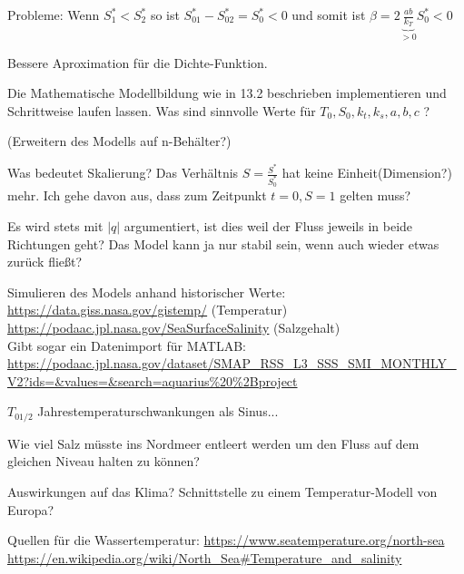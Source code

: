 \documentclass[11pt,a4paper]{article}
\begin{document}
	Probleme:
	Wenn \(S^*_1 < S^*_2\) so ist \(S^*_01 - S^*_02 = S^*_0 < 0\) und somit ist \(\beta = 2\underbrace{\frac{ab}{k_T}}_{>0}S^*_0 < 0\)

	Bessere Aproximation für die Dichte-Funktion.
	
	Die Mathematische Modellbildung wie in 13.2 beschrieben implementieren und Schrittweise laufen lassen. Was sind sinnvolle Werte für \( T_0, S_0, k_t, k_s,  a, b, c\) ?

	(Erweitern des Modells auf n-Behälter?)

	Was bedeutet Skalierung?	 Das Verhältnis \( S = \frac{S^*}{S^*_0} \) hat keine Einheit(Dimension?) mehr. Ich gehe davon aus, dass zum Zeitpunkt \( t=0, S=1 \) gelten muss?
	
	Es wird stets mit \( |q| \) argumentiert, ist dies weil der Fluss jeweils in beide Richtungen geht? Das Model kann ja nur stabil sein, wenn auch wieder etwas zurück fließt?
	
	Simulieren des Models anhand historischer Werte: \\
	\url{https://data.giss.nasa.gov/gistemp/} (Temperatur) \\
	\url{https://podaac.jpl.nasa.gov/SeaSurfaceSalinity} (Salzgehalt) \\
	Gibt sogar ein Datenimport für MATLAB: \url{https://podaac.jpl.nasa.gov/dataset/SMAP_RSS_L3_SSS_SMI_MONTHLY_V2?ids=&values=&search=aquarius%20%2Bproject}
	
	\( T_{0 1/2} \) Jahrestemperaturschwankungen als Sinus...
	
	Wie viel Salz müsste ins Nordmeer entleert werden um den Fluss auf dem gleichen Niveau halten zu können?
	
	Auswirkungen auf das Klima? Schnittstelle zu einem Temperatur-Modell von Europa?
	
	Quellen für die Wassertemperatur:
	\url{https://www.seatemperature.org/north-sea}	
	\url{https://en.wikipedia.org/wiki/North_Sea#Temperature_and_salinity}
	
\end{document}
